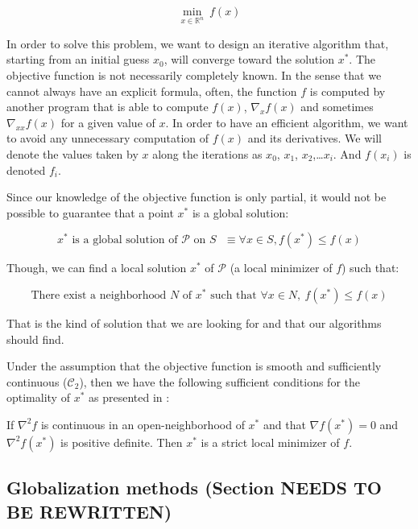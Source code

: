 \begin{equation}
  \min_{x\in\mathbb{R}^n}\ {f(x)}
\label{eq:unconstrainedOptim}
\end{equation}

In order to solve this problem, we want to design an iterative algorithm that, starting from an initial guess $x_0$, will converge toward the solution $x^*$.
The objective function is not necessarily completely known.
In the sense that we cannot always have an explicit formula, often, the function $f$ is computed by another program that is able to compute $f(x)$, $\nabla_x f(x)$ and sometimes $\nabla_{xx} f(x)$ for a given value of $x$.
In order to have an efficient algorithm, we want to avoid any unnecessary computation of $f(x)$ and its derivatives.
We will denote the values taken by $x$ along the iterations as $x_0$, $x_1$, $x_2$,\ldots $x_i$.
And $f(x_i)$ is denoted $f_i$.

Since our knowledge of the objective function is only partial, it would not be possible to guarantee that a point $x^*$ is a global solution:

\begin{equation}
  \text{$x^*$ is a global solution of $\mathcal{P}$ on $\mathit{S}$ } \equiv \forall x \in \mathit{S}, f(x^*) \leq f(x)
\end{equation}

Though, we can find a local solution $x^*$ of $\mathcal{P}$ (a local minimizer of $f$) such that:

\begin{equation}
  \text{There exist a neighborhood } \mathit{N}\text{ of }x^*\text{ such that
  }\forall x\in \mathit{N}, \ f(x^*) \leq f(x)
\end{equation}

That is the kind of solution that we are looking for and that our algorithms should find.

Under the assumption that the objective function is smooth and sufficiently continuous ($\mathcal{C}_2$), then we have the following sufficient conditions for the optimality of $x^*$ as presented in \cite{nocedal:book:2006}:

\begin{theorem}
  If $\nabla^2f$ is continuous in an open-neighborhood of $x^*$ and that $\nabla f(x^*)=0$ and $\nabla^2 f(x^*)$ is positive definite.
  Then $x^*$ is a strict local minimizer of $f$.
  \label{optimalityTheorem}
\end{theorem}

\subsection{Globalization methods (Section NEEDS TO BE REWRITTEN)}


